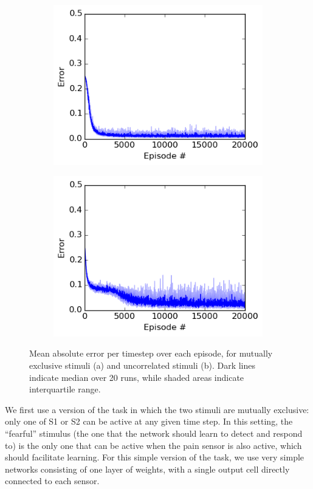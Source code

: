 \documentclass{article}
\begin{document}
\begin{figure}
\centering
\begin{subfigure}[t]{0.4\textwidth}
\centering
\includegraphics[scale=0.5]{figexcl.png}
\end{subfigure}
\begin{subfigure}[t]{0.4\textwidth}
\centering
\includegraphics[scale=0.5]{figuncorr.png}
\end{subfigure}
\caption{Mean absolute error per timestep over each episode, for mutually
exclusive stimuli (a) and uncorrelated stimuli (b). Dark lines indicate median
over 20 runs, while shaded areas indicate interquartile range.}
\label{fig:error}
\end{figure}


We first use a version of the task in which the two stimuli are mutually
exclusive: only one of S1 or S2 can be active at any given time step. In this
setting, the ``fearful'' stimulus (the one that the network should learn to
detect and respond to) is the only one that can be active when the
pain sensor is also active, which should facilitate learning. 
For this simple version of the task, we use very simple networks consisting of one layer of weights, with a single
output cell directly connected to each sensor. 
\end{document}
